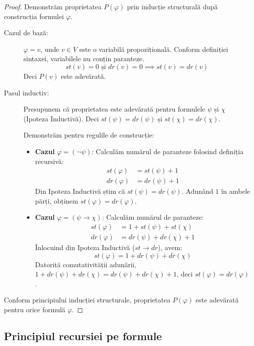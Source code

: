 \begin{proof}
	Demonstrăm proprietatea $P(\varphi)$ prin inducție structurală după construcția formulei $\varphi$.

	\begin{description}
		\item[Cazul de bază:] $\varphi = v$, unde $v \in V$ este o variabilă propozițională.
			Conform definiției sintaxei, variabilele nu conțin paranteze.
			\[ st(v) = 0 \text{ și } dr(v) = 0 \implies st(v) = dr(v) \]
			Deci $P(v)$ este adevărată.

		\item[Pasul inductiv:] Presupunem că proprietatea este adevărată pentru formulele $\psi$ și $\chi$ (Ipoteza Inductivă). Deci $st(\psi) = dr(\psi)$ și $st(\chi) = dr(\chi)$.

			Demonstrăm pentru regulile de construcție:

			\begin{itemize}
				\item \textbf{Cazul} $\varphi = (\neg \psi)$:
				      Calculăm numărul de paranteze folosind definiția recursivă:
				      \begin{align*}
					      st(\varphi) & = st(\psi) + 1 \\
					      dr(\varphi) & = dr(\psi) + 1
				      \end{align*}
				      Din Ipoteza Inductivă știm că $st(\psi) = dr(\psi)$. Adunând $1$ în ambele părți, obținem $st(\varphi) = dr(\varphi)$.

				\item \textbf{Cazul} $\varphi = (\psi \to \chi)$:
				      Calculăm numărul de paranteze:
				      \begin{align*}
					      st(\varphi) & = 1 + st(\psi) + st(\chi) \\
					      dr(\varphi) & = dr(\psi) + dr(\chi) + 1
				      \end{align*}
				      Înlocuind din Ipoteza Inductivă ($st \to dr$), avem:
				      \[ st(\varphi) = 1 + dr(\psi) + dr(\chi) \]
				      Datorită comutativității adunării, $1 + dr(\psi) + dr(\chi) = dr(\psi) + dr(\chi) + 1$, deci $st(\varphi) = dr(\varphi)$.
			\end{itemize}
	\end{description}

	Conform principiului inducției structurale, proprietatea $P(\varphi)$ este adevărată pentru orice formulă $\varphi$.
\end{proof}

\subsection{Principiul recursiei pe formule}

